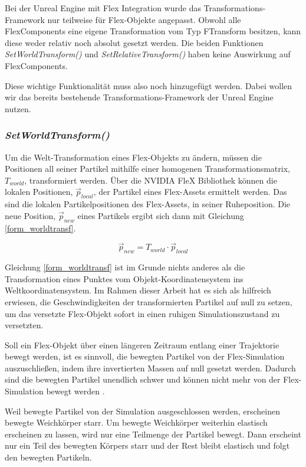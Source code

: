 Bei der Unreal Engine mit Flex Integration wurde das Transformations-Framework nur teilweise für Flex-Objekte angepasst. Obwohl alle FlexComponents eine eigene Transformation vom Typ FTransform besitzen, kann diese weder relativ noch absolut gesetzt werden. Die beiden Funktionen \textit{SetWorldTransform()} und \textit{SetRelativeTransform()} haben keine Auswirkung auf FlexComponents.

Diese wichtige Funktionalität muss also noch hinzugefügt werden. Dabei wollen wir das bereits bestehende Transformations-Framework der Unreal Engine nutzen.

\subsubsection{\textit{SetWorldTransform()}}

Um die Welt-Transformation eines Flex-Objekts zu ändern, müssen die Positionen all seiner Partikel mithilfe einer homogenen Transformationsmatrix, $T_{world}$, transformiert werden. Über die NVIDIA FleX Bibliothek können die lokalen Positionen, $\vec{p}_{local}$, der Partikel eines Flex-Assets 
ermittelt werden. Das sind die lokalen Partikelpositionen des Flex-Assets, in seiner Ruheposition. Die neue Position, $\vec{p}_{new}$ eines Partikels ergibt sich dann mit Gleichung \ref{form_worldtransf}.

\begin{equation}
\vec{p}_{new} = T_{world} \cdot \vec{p}_{local}
\label{form_worldtransf}
\end{equation}

Gleichung \ref{form_worldtransf} ist im Grunde nichts anderes als die Transformation eines Punktes vom Objekt-Koordinatensystem ins Weltkoordinatensystem. Im Rahmen dieser Arbeit hat es sich als hilfreich erwiesen, die Geschwindigkeiten der transformierten Partikel auf null zu setzen, um das versetzte Flex-Objekt sofort in einen ruhigen Simulationszustand zu versetzten. 

Soll ein Flex-Objekt  über einen längeren Zeitraum entlang einer Trajektorie bewegt werden, ist es sinnvoll, die bewegten Partikel von der Flex-Simulation auszuschließen, indem ihre invertierten Massen auf null gesetzt werden. Dadurch sind die bewegten Partikel unendlich schwer und können nicht mehr von der Flex-Simulation bewegt werden \cite{PBD} \cite{UPP}. 

Weil bewegte Partikel von der Simulation ausgeschlossen werden, erscheinen bewegte Weichkörper starr. Um bewegte Weichkörper weiterhin elastisch erscheinen zu lassen, wird nur eine Teilmenge der Partikel bewegt. Dann erscheint nur ein Teil des bewegten Körpers starr und der Rest bleibt elastisch und folgt den bewegten Partikeln.

